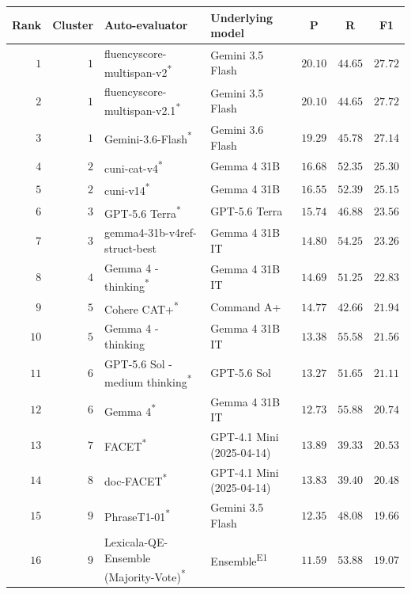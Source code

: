 \begin{table}[t]
\centering
\small
\begin{tabular}{rrllrrr}
\toprule
\multicolumn{1}{c}{Rank} & \multicolumn{1}{c}{Cluster} & Auto-evaluator & Underlying model & \multicolumn{1}{c}{P} & \multicolumn{1}{c}{R} & \multicolumn{1}{c}{F1} \\
\midrule
$1$ & $1$ & fluencyscore-multispan-v2\textsuperscript{*} & Gemini 3.5 Flash & $20.10$ & $44.65$ & $27.72$ \\
$2$ & $1$ & fluencyscore-multispan-v2.1\textsuperscript{*} & Gemini 3.5 Flash & $20.10$ & $44.65$ & $27.72$ \\
\rowcolor{black!15} $3$ & $1$ & Gemini-3.6-Flash\textsuperscript{*} & Gemini 3.6 Flash & $19.29$ & $45.78$ & $27.14$ \\
$4$ & $2$ & cuni-cat-v4\textsuperscript{*} & Gemma 4 31B & $16.68$ & $52.35$ & $25.30$ \\
$5$ & $2$ & cuni-v14\textsuperscript{*} & Gemma 4 31B & $16.55$ & $52.39$ & $25.15$ \\
\rowcolor{black!15} $6$ & $3$ & GPT-5.6 Terra\textsuperscript{*} & GPT-5.6 Terra & $15.74$ & $46.88$ & $23.56$ \\
$7$ & $3$ & gemma4-31b-v4ref-struct-best & Gemma 4 31B IT & $14.80$ & $54.25$ & $23.26$ \\
\rowcolor{black!15} $8$ & $4$ & Gemma 4 - thinking\textsuperscript{*} & Gemma 4 31B IT & $14.69$ & $51.25$ & $22.83$ \\
$9$ & $5$ & Cohere CAT+\textsuperscript{*} & Command A+ & $14.77$ & $42.66$ & $21.94$ \\
\rowcolor{black!15} $10$ & $5$ & Gemma 4 - thinking & Gemma 4 31B IT & $13.38$ & $55.58$ & $21.56$ \\
\rowcolor{black!15} $11$ & $6$ & GPT-5.6 Sol - medium thinking\textsuperscript{*} & GPT-5.6 Sol & $13.27$ & $51.65$ & $21.11$ \\
\rowcolor{black!15} $12$ & $6$ & Gemma 4\textsuperscript{*} & Gemma 4 31B IT & $12.73$ & $55.88$ & $20.74$ \\
$13$ & $7$ & FACET\textsuperscript{*} & GPT-4.1 Mini (2025-04-14) & $13.89$ & $39.33$ & $20.53$ \\
$14$ & $8$ & doc-FACET\textsuperscript{*} & GPT-4.1 Mini (2025-04-14) & $13.83$ & $39.40$ & $20.48$ \\
$15$ & $9$ & PhraseT1-01\textsuperscript{*} & Gemini 3.5 Flash & $12.35$ & $48.08$ & $19.66$ \\
$16$ & $9$ & Lexicala-QE-Ensemble (Majority-Vote)\textsuperscript{*} & Ensemble\textsuperscript{E1} & $11.59$ & $53.88$ & $19.07$ \\

\end{tabular}
\end{table}
